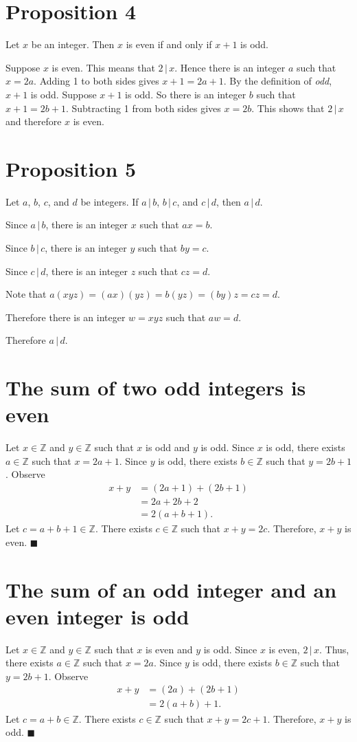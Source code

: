\documentclass[12pt]{article}
\begin{document}
\section*{Proposition 4}
Let $x$ be an integer. Then $x$ is even if and only if $x+1$ is odd.

Suppose $x$ is even. This means that $2\,|\,x$. Hence there is an integer $a$ such that $x=2a$. Adding 1 to both sides gives $x+1=2a+1$. By the definition of \textit{odd}, $x+1$ is odd.
Suppose $x+1$ is odd. So there is an integer $b$ such that $x+1=2b+1$. Subtracting 1 from both sides gives $x=2b$. This shows that $2\,|\,x$ and therefore $x$ is even.
\section*{Proposition 5}
Let $a$, $b$, $c$, and $d$ be integers. If $a\,|\,b$, $b\,|\,c$, and $c\,|\,d$, then $a\,|\,d$.

Since $a\,|\,b$, there is an integer $x$ such that $ax=b$.

Since $b\,|\,c$, there is an integer $y$ such that $by=c$.

Since $c\,|\,d$, there is an integer $z$ such that $cz=d$.

Note that $a(xyz)=(ax)(yz)=b(yz)=(by)z=cz=d$.

Therefore there is an integer $w=xyz$ such that $aw=d$.

Therefore $a\,|\,d$.
\section{The sum of two odd integers is even}
Let $x\in\mathbb{Z}$ and $y\in\mathbb{Z}$ such that $x$ is odd and $y$ is odd. Since $x$ is odd, there exists $a\in\mathbb{Z}$ such that $x=2a+1$. Since $y$ is odd, there exists $b\in\mathbb{Z}$ such that $y=2b+1$. Observe
\begin{align*}
x+y
&=(2a+1)+(2b+1)\\
&=2a+2b+2\\
&=2(a+b+1).
\end{align*}
Let $c=a+b+1\in\mathbb{Z}$. There exists $c\in\mathbb{Z}$ such that $x+y=2c$. Therefore, $x+y$ is even. $\blacksquare$
\section{The sum of an odd integer and an even integer is odd}
Let $x\in\mathbb{Z}$ and $y\in\mathbb{Z}$ such that $x$ is even and $y$ is odd. Since $x$ is even, $2\,|\,x$. Thus, there exists $a\in\mathbb{Z}$ such that $x=2a$. Since $y$ is odd, there exists $b\in\mathbb{Z}$ such that $y=2b+1$. Observe
\begin{align*}
x+y
&=(2a)+(2b+1)\\
&=2(a+b)+1.
\end{align*}
Let $c=a+b\in\mathbb{Z}$. There exists $c\in\mathbb{Z}$ such that $x+y=2c+1$. Therefore, $x+y$ is odd. $\blacksquare$
\end{document}

